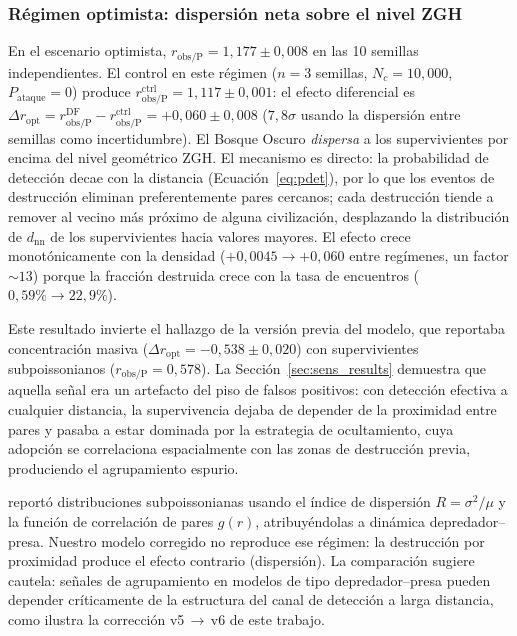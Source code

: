 \documentclass[useAMS,usenatbib,onecolumn]{mn2e}
\begin{document}
\subsubsection{Régimen optimista: dispersión neta sobre el nivel ZGH}
\label{sec:inversion}

En el escenario optimista, $r_\text{obs/P} = 1{,}177 \pm 0{,}008$ en
las 10 semillas independientes.
El control en este régimen ($n = 3$ semillas, $N_c = 10{,}000$,
$P_\text{ataque} = 0$) produce
$r_\text{obs/P}^\text{ctrl} = 1{,}117 \pm 0{,}001$: el efecto
diferencial es
$\Delta r_\text{opt} = r_\text{obs/P}^\text{DF} -
r_\text{obs/P}^\text{ctrl} = +0{,}060 \pm 0{,}008$ ($7{,}8\sigma$
usando la dispersión entre semillas como incertidumbre).
El Bosque Oscuro \emph{dispersa} a los supervivientes por encima del
nivel geométrico ZGH.
El mecanismo es directo: la probabilidad de detección decae con la
distancia (Ecuación~\ref{eq:pdet}), por lo que los eventos de
destrucción eliminan preferentemente pares cercanos; cada destrucción
tiende a remover al vecino más próximo de alguna civilización,
desplazando la distribución de $d_\text{nn}$ de los supervivientes
hacia valores mayores.
El efecto crece monotónicamente con la densidad
($+0{,}0045 \to +0{,}060$ entre regímenes, un factor $\sim 13$)
porque la fracción destruida crece con la tasa de encuentros
($0{,}59\% \to 22{,}9\%$).

Este resultado invierte el hallazgo de la versión previa del modelo,
que reportaba concentración masiva
($\Delta r_\text{opt} = -0{,}538 \pm 0{,}020$) con supervivientes
subpoissonianos ($r_\text{obs/P} = 0{,}578$).
La Sección~\ref{sec:sens_results} demuestra que aquella señal era un
artefacto del piso de falsos positivos: con detección efectiva a
cualquier distancia, la supervivencia dejaba de depender de la
proximidad entre pares y pasaba a estar dominada por la estrategia de
ocultamiento, cuya adopción se correlaciona espacialmente con las
zonas de destrucción previa, produciendo el agrupamiento espurio.

\citet{foucher2023} reportó distribuciones subpoissonianas usando el
índice de dispersión $R = \sigma^2/\mu$ y la función de correlación de
pares $g(r)$, atribuyéndolas a dinámica depredador--presa.
Nuestro modelo corregido no reproduce ese régimen: la destrucción por
proximidad produce el efecto contrario (dispersión).
La comparación sugiere cautela: señales de agrupamiento en modelos de
tipo depredador--presa pueden depender críticamente de la estructura
del canal de detección a larga distancia, como ilustra la corrección
v5\,$\to$\,v6 de este trabajo.
\end{document}
